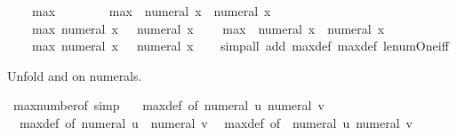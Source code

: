 \begin{isabellebody}
\ \ \ \ {\isachardoublequoteopen}max{\isacharprime}{\kern0pt}\ {}\ {}\ {\isacharequal}{\kern0pt}\ {}{\isachardoublequoteclose}\isanewline
\ \ \ \ {\isachardoublequoteopen}max{\isacharprime}{\kern0pt}\ {}\ {\isacharparenleft}{\kern0pt}numeral\ x{\isacharparenright}{\kern0pt}\ {\isacharequal}{\kern0pt}\ numeral\ x{\isachardoublequoteclose}\isanewline
\ \ \ \ {\isachardoublequoteopen}max{\isacharprime}{\kern0pt}\ {\isacharparenleft}{\kern0pt}numeral\ x{\isacharparenright}{\kern0pt}\ {}\ {\isacharequal}{\kern0pt}\ numeral\ x{\isachardoublequoteclose}\isanewline
\ \ \ \ {\isachardoublequoteopen}max{\isacharprime}{\kern0pt}\ {}\ {\isacharparenleft}{\kern0pt}numeral\ x{\isacharparenright}{\kern0pt}\ {\isacharequal}{\kern0pt}\ numeral\ x{\isachardoublequoteclose}\isanewline
\ \ \ \ {\isachardoublequoteopen}max{\isacharprime}{\kern0pt}\ {\isacharparenleft}{\kern0pt}numeral\ x{\isacharparenright}{\kern0pt}\ {}\ {\isacharequal}{\kern0pt}\ numeral\ x{\isachardoublequoteclose}\isanewline
%
\isadelimproof
\ \ %
\endisadelimproof
%
\isatagproof
{}\isamarkupfalse%
\ {\isacharparenleft}{\kern0pt}simp{\isacharunderscore}{\kern0pt}all\ add{\isacharcolon}{\kern0pt}\ max{\isacharprime}{\kern0pt}{\isacharunderscore}{\kern0pt}def\ max{\isacharunderscore}{\kern0pt}def\ le{\isacharunderscore}{\kern0pt}num{\isacharunderscore}{\kern0pt}One{\isacharunderscore}{\kern0pt}iff{\isacharparenright}{\kern0pt}%
\endisatagproof
{\isafoldproof}%
%
\isadelimproof
\isanewline
%
\endisadelimproof
\isanewline
{}\isamarkupfalse%
%
\begin{isamarkuptext}%
Unfold  and  on numerals.%
\end{isamarkuptext}\isamarkuptrue%
\isamarkupfalse%
\ max{\isacharunderscore}{\kern0pt}number{\isacharunderscore}{\kern0pt}of\ {\isacharbrackleft}{\kern0pt}simp{\isacharbrackright}{\kern0pt}\ {\isacharequal}{\kern0pt}\isanewline
\ \ max{\isacharunderscore}{\kern0pt}def\ {\isacharbrackleft}{\kern0pt}of\ {\isachardoublequoteopen}numeral\ u{\isachardoublequoteclose}\ {\isachardoublequoteopen}numeral\ v{\isachardoublequoteclose}{\isacharbrackright}{\kern0pt}\isanewline
\ \ max{\isacharunderscore}{\kern0pt}def\ {\isacharbrackleft}{\kern0pt}of\ {\isachardoublequoteopen}numeral\ u{\isachardoublequoteclose}\ {\isachardoublequoteopen}{\isacharminus}{\kern0pt}\ numeral\ v{\isachardoublequoteclose}{\isacharbrackright}{\kern0pt}\isanewline
\ \ max{\isacharunderscore}{\kern0pt}def\ {\isacharbrackleft}{\kern0pt}of\ {\isachardoublequoteopen}{\isacharminus}{\kern0pt}\ numeral\ u{\isachardoublequoteclose}\ {\isachardoublequoteopen}numeral\ v{\isachardoublequoteclose}{\isacharbrackright}{\kern0pt}\isanewline

\end{isabellebody}
